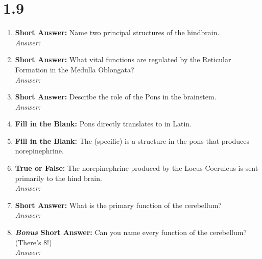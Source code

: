 \section*{1.9}
\begin{enumerate}[label=\textbf{Q1.9.\arabic*}]
      \item \textbf{Short Answer:} Name two principal structures of the hindbrain. \\
            \textit{Answer:} \\%

      \item \textbf{Short Answer:} What vital functions are regulated by the Reticular Formation in the Medulla Oblongata? \\
            \textit{Answer:} \\ %

      \item \textbf{Short Answer:} Describe the role of the Pons in the brainstem. \\
            \textit{Answer:} %

      \item \textbf{Fill in the Blank:} Pons directly translates to \underline{\hspace{3cm}} in Latin. \\

      \item \textbf{Fill in the Blank:} The \underline{\hspace{3cm}} (specific) is a structure in the pons that produces norepinephrine. \\

      \item \textbf{True or False:} The norepinephrine produced by the Locus Coeruleus is sent primarily to the hind brain. \\
            \textit{Answer:} %

      \item \textbf{Short Answer:} What is the primary function of the cerebellum? \\
            \textit{Answer:} %

      \item \textbf{\textit{Bonus} Short Answer:} Can you name every function of the cerebellum? (There's 8!) \\
            \textit{Answer:} \\[0.5em]%


\end{enumerate}
